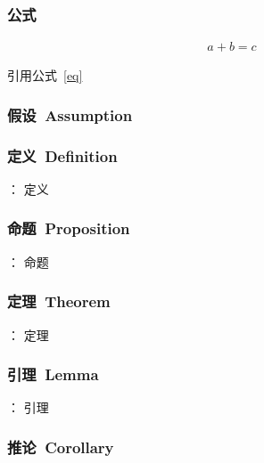 \subsubsection{公式}

\begin{align}
\label{eq}
    a+b=c
\end{align}

    引用公式~\eqref{eq}

\subsubsection{假设~Assumption}


\subsubsection{定义~Definition}

\begin{definition}：\label{def}
    定义
\end{definition}

\subsubsection{命题~Proposition}

\begin{proposition}： \label{pro}
    命题
\end{proposition}

\subsubsection{定理~Theorem}

\begin{theorem}： \label{th}
    定理
\end{theorem}

\subsubsection{引理~Lemma}

\begin{lemma}： \label{le}
     引理
\end{lemma}




\subsubsection{推论~Corollary}

